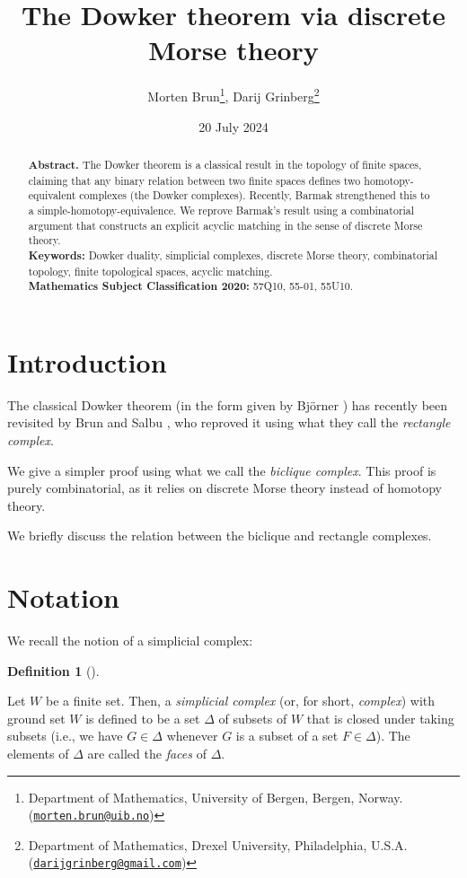 \documentclass[numbers=enddot,12pt,final,onecolumn,notitlepage]{scrartcl}%
\theoremstyle{definition}
\newtheorem{defi}[theo]{Definition}
\newenvironment{definition}[1][]
{\begin{defi}[#1]\begin{leftbar}}
{\end{leftbar}\end{defi}}
\newcommand{\email}[1]{\href{mailto:#1}{\texttt{#1}}}
\begin{document}
\title{The Dowker theorem via discrete Morse theory}
\author{Morten Brun\footnote{Department of Mathematics, University of Bergen, Bergen, Norway. (\email{morten.brun@uib.no})},
Darij Grinberg\footnote{Department of Mathematics, Drexel University, Philadelphia, U.S.A. (\email{darijgrinberg@gmail.com})}}
\date{20 July 2024}
\maketitle
\begin{abstract}
\textbf{Abstract.}
The Dowker theorem is a classical result in the topology of finite spaces,
claiming that any binary relation between two finite spaces defines two
homotopy-equivalent complexes (the Dowker complexes).
Recently, Barmak strengthened this to a simple-homotopy-equivalence.
We reprove Barmak's result using a combinatorial argument that constructs
an explicit acyclic matching in the sense of discrete Morse theory.
\medskip\\
\textbf{Keywords:}
Dowker duality, simplicial complexes, discrete Morse theory,
combinatorial topology, finite topological spaces, acyclic matching.
\medskip\\
\textbf{Mathematics Subject Classification 2020:}
57Q10, 55-01, 55U10.
\end{abstract}

\section{Introduction}

The classical Dowker theorem (in the form given by Bj\"{o}rner
\cite[Theorem 10.9]{Bjorne95}) has recently been revisited by Brun and Salbu
\cite{BruSal22}, who reproved it using what they call the \textit{rectangle
complex}.

We give a simpler proof using what we call the \textit{biclique complex}. This
proof is purely combinatorial, as it relies on discrete Morse theory instead
of homotopy theory.

We briefly discuss the relation between the biclique and rectangle complexes.

\section{Notation}

We recall the notion of a simplicial complex:

\begin{definition}
Let $W$ be a finite set. Then, a \emph{simplicial complex} (or, for short,
\emph{complex}) with ground set $W$ is defined to be a set $\Delta$ of subsets
of $W$ that is closed under taking subsets (i.e., we have $G\in\Delta$
whenever $G$ is a subset of a set $F\in\Delta$). The elements of $\Delta$ are
called the \emph{faces} of $\Delta$.
\end{definition}
\end{document}
